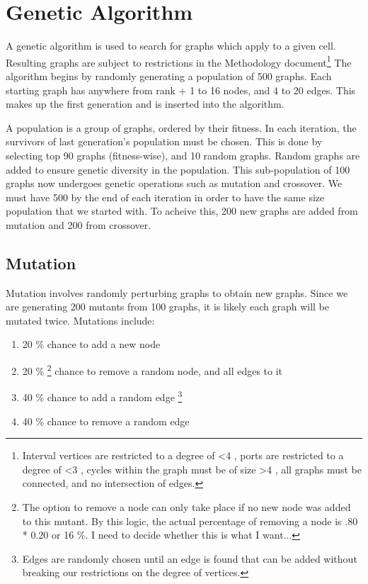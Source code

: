\documentclass[12pt]{article}
\begin{document}
\section{Genetic Algorithm}

A genetic algorithm is used to search for graphs which apply to a given cell. Resulting graphs are subject to restrictions in the Methodology document\footnote{Interval vertices are restricted to a degree of \textless 4
, ports are restricted to a degree of \textless 3
, cycles within the graph must be of size \textgreater 4
, all graphs must be connected, and
no intersection of edges.} The algorithm begins by randomly generating a population of 500 graphs. Each starting graph has anywhere from rank + 1 to 16 nodes, and 4 to 20 edges. This makes up the first generation and is inserted into the algorithm.

A population is a group of graphs, ordered by their fitness. 
In each iteration, the survivors of last generation's population must be chosen. This is done by selecting top 90 graphs (fitness-wise), and 10 random graphs. Random graphs are added to ensure genetic diversity in the population. This sub-population of 100 graphs now undergoes genetic operations such as mutation and crossover. We must have 500 by the end of each iteration in order to have the same size population that we started with. To acheive this, 200 new graphs are added from mutation and 200 from crossover. 

\subsection{Mutation}
Mutation involves randomly perturbing graphs to obtain new graphs. Since we are generating 200 mutants from 100 graphs, it is likely each graph will be mutated twice. Mutations include:
\begin{enumerate}
\item 20 \% chance to add a new node
\item 20 \% \footnote{The option to remove a node can only take place if no new node was added to this mutant. By this logic, the actual percentage of removing a node is .80 * 0.20 or 16 \%. I need to decide whether this is what I want...} chance to remove a random node, and all edges to it
\item 40 \% chance to add a random edge \footnote{ Edges are randomly chosen until an edge is found that can be added without breaking our restrictions on the degree of vertices.}
\item 40 \% chance to remove a random edge
\end{enumerate}
\end{document}
